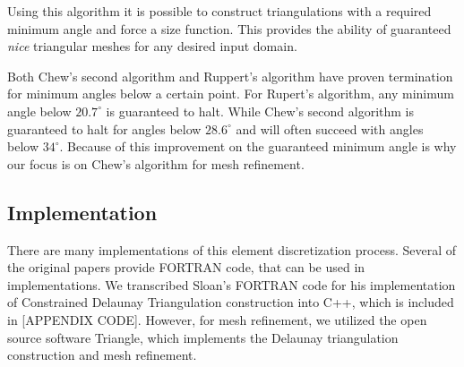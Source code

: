 \documentclass[../fem.tex]{subfiles}
\begin{document}
Using this algorithm it is possible to construct triangulations with a required
minimum angle and force a size function. This provides the ability of
guaranteed \textit{nice} triangular meshes for any desired input domain.

Both Chew's second algorithm and Ruppert's algorithm have proven termination
for minimum angles below a certain point. For Rupert's algorithm, any minimum
angle below $20.7^{\circ}$ is guaranteed to halt. While Chew's second algorithm
is guaranteed to halt for angles below $28.6^{\circ}$ and will often succeed
with angles below $34^{\circ}$. Because of this improvement on the guaranteed
minimum angle is why our focus is on Chew's algorithm for mesh refinement.



\subsection{Implementation}%
\label{sub:implementation}

There are many implementations of this element discretization process. Several
of the original papers provide FORTRAN code, that can be used in
implementations. We transcribed Sloan's FORTRAN code for his implementation of
Constrained Delaunay Triangulation construction into C++, which is included in
[APPENDIX CODE]. However, for mesh refinement, we utilized the open source
software Triangle\cite{T_SOF}, which implements the Delaunay triangulation
construction and mesh refinement.

\end{document}
